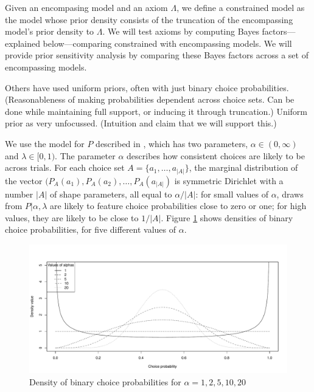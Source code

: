 \documentclass[11pt,letter]{article}
\begin{document}
Given an encompasing model and an axiom $\Lambda$, we define a constrained model as the model whose prior density consists of the truncation of the encompassing model's prior density to $\Lambda$.
We will test axioms by computing Bayes factors---explained below---comparing constrained with encompassing models.
We will provide prior sensitivity analysis by comparing these Bayes factors across a set of encompassing models.

Others have used uniform priors, often with just binary choice probabilities.
(Reasonableness of making probabilities dependent across choice sets. Can be done while maintaining full support, or inducing it through truncation.)
Uniform prior as very unfocussed. (Intuition and claim that we will support this.)

We use the model for $P$ described in , which has two parameters, $\alpha \in (0,\infty)$ and $\lambda \in [0,1)$.
The parameter $\alpha$ describes how consistent choices are likely to be across trials.
For each choice set $A = \{a_1,\ldots,a_{|A|}\}$, the marginal distribution of the vector $(P_A(a_1), P_A(a_2), \ldots, P_A(a_{|A|})$ is symmetric Dirichlet with a number $|A|$ of shape parameters, all equal to $\alpha / |A|$: for small values of $\alpha$, draws from $P|\alpha,\lambda$ are likely to feature choice probabilities close to zero or one; for high values, they are likely to be close to $1/|A|$.
Figure \ref{f:bcp} shows densities of binary choice probabilities, for five different values of $\alpha$.

\begin{figure}
	\begin{center}
	\includegraphics[width=15cm]{Figures/bcp.pdf}
	\caption{Density of binary choice probabilities for $\alpha = 1, 2, 5, 10, 20$}\label{f:bcp}
	\end{center}
\end{figure}
\end{document}
